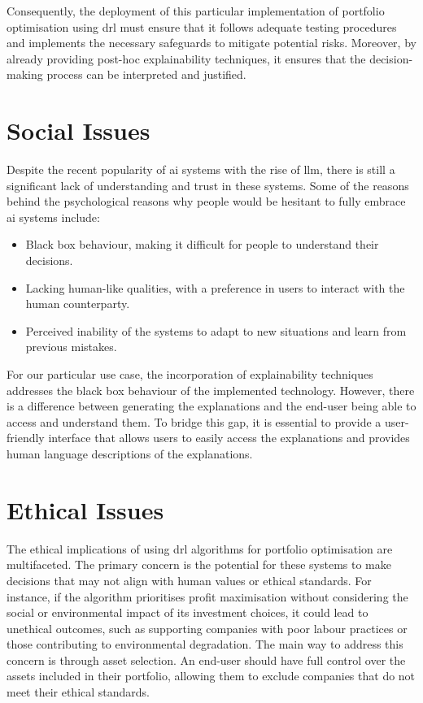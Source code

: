 Consequently, the deployment of this particular implementation of portfolio optimisation using \acrfull{drl} must ensure that it follows adequate testing procedures and implements the necessary safeguards to mitigate potential risks. Moreover, by already providing post-hoc explainability techniques, it ensures that the decision-making process can be interpreted and justified. 

\section{Social Issues} \label{sec:social-issues}

Despite the recent popularity of \acrfull{ai} systems with the rise of \acrfull{llm}, there is still a significant lack of understanding and trust in these systems. Some of the reasons behind the psychological reasons why people would be hesitant to fully embrace \acrshort{ai} systems include:
\begin{itemize}
    \item Black box behaviour, making it difficult for people to understand their decisions.
    \item Lacking human-like qualities, with a preference in users to interact with the human counterparty.
    \item Perceived inability of the systems to adapt to new situations and learn from previous mistakes.
\end{itemize}

For our particular use case, the incorporation of explainability techniques addresses the black box behaviour of the implemented technology. However, there is a difference between generating the explanations and the end-user being able to access and understand them. To bridge this gap, it is essential to provide a user-friendly interface that allows users to easily access the explanations and provides human language descriptions of the explanations. 


\section{Ethical Issues} \label{sec:ethical-issues}

The ethical implications of using \acrshort{drl} algorithms for portfolio optimisation are multifaceted. The primary concern is the potential for these systems to make decisions that may not align with human values or ethical standards. For instance, if the algorithm prioritises profit maximisation without considering the social or environmental impact of its investment choices, it could lead to unethical outcomes, such as supporting companies with poor labour practices or those contributing to environmental degradation. The main way to address this concern is through asset selection. An end-user should have full control over the assets included in their portfolio, allowing them to exclude companies that do not meet their ethical standards. 

